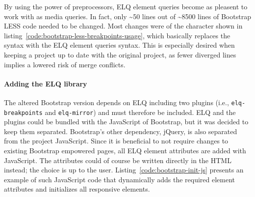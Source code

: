 \documentclass[a4paper,11pt]{kth-mag}
\newcommand{\code}[1]{\texttt{#1}}
\begin{document}
      By using the power of preprocessors, \gls{ELQ} element queries become as pleasent to work with as \gls{media queries}.
      In fact, only \textasciitilde50 lines out of \textasciitilde8500 lines of \gls{Bootstrap} \gls{LESS} code needed to be changed.
      Most changes were of the character shown in listing~\ref{code:bootstrap-less-breakpoints-usage}, which basically replaces the  syntax with the \gls{ELQ} element queries syntax.
      This is especially desired when keeping a  project up to date with the original project, as fewer diverged lines implies a lowered risk of merge conflicts.

      \paragraph{Adding the \gls{ELQ} library}
      The altered \gls{Bootstrap} version depends on \gls{ELQ} including two plugins (i.e., \code{elq-breakpoints} and \code{elq-mirror}) and must therefore be included.
      \gls{ELQ} and the plugins could be bundled with the \gls{JavaScript} of \gls{Bootstrap}, but it was decided to keep them separated.
      \gls{Bootstrap}'s other dependency, jQuery, is also separated from the project \gls{JavaScript}.
      Since it is beneficial to not require changes to existing \gls{Bootstrap} empowered pages, all \gls{ELQ} element attributes are added with \gls{JavaScript}.
      The attributes could of course be written directly in the \gls{HTML} instead; the choice is up to the user.
      Listing~\ref{code:bootstrap-init-js} presents an example of such \gls{JavaScript} code that dynamically adds the required element attributes and initializes all \gls{responsive} \glspl{element}.
\end{document}
